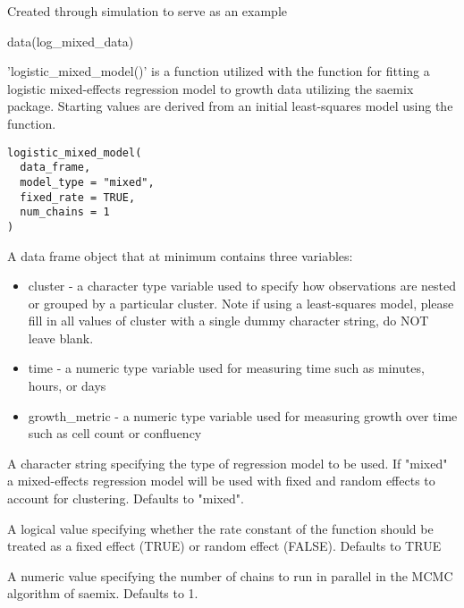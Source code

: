 \documentclass[a4paper]{book}
\begin{document}
%
\begin{Source}
Created through simulation to serve as an example
\end{Source}
%
\begin{Examples}
\begin{ExampleCode}
data(log_mixed_data)
\end{ExampleCode}
\end{Examples}
%
\begin{Description}
'logistic\_mixed\_model()' is a function utilized with the
 function for fitting a logistic
mixed-effects regression model to growth data utilizing the saemix package.
Starting values are derived from an initial least-squares model using the
 function.
\end{Description}
%
\begin{Usage}
\begin{verbatim}
logistic_mixed_model(
  data_frame,
  model_type = "mixed",
  fixed_rate = TRUE,
  num_chains = 1
)
\end{verbatim}
\end{Usage}
%
\begin{Arguments}
\begin{ldescription}
\item[\code{data\_frame}] A data frame object that at minimum contains three
variables:
\begin{itemize}

\item{} cluster - a character type variable used to specify how observations
are nested or grouped by a particular cluster. Note if using a
least-squares model, please fill in all values of cluster with a single
dummy character string, do NOT leave blank.
\item{} time - a numeric type variable used for measuring time such as
minutes, hours, or days
\item{} growth\_metric - a numeric type variable used for measuring growth
over time such as cell count or confluency

\end{itemize}


\item[\code{model\_type}] A character string specifying the type of regression
model to be used. If "mixed" a mixed-effects regression model will be used
with fixed and random effects to account for clustering. Defaults to "mixed".

\item[\code{fixed\_rate}] A logical value specifying whether the rate constant
of the function should be treated as a fixed effect (TRUE) or random
effect (FALSE). Defaults to TRUE

\item[\code{num\_chains}] A numeric value specifying the number of chains to run
in parallel in the MCMC algorithm of saemix. Defaults to 1.
\end{ldescription}
\end{Arguments}
\end{document}
